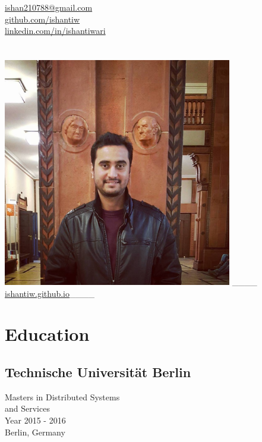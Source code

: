 \documentclass[]{hieudo-build}
\begin{document}
%
%
{
	\faEnvelope \href{mailto:ishan210788@gmail.com}{ ishan210788@gmail.com}\\
	\faGithub \href{https://github.com/ishantiw}{   github.com/ishantiw}\\
	\faLinkedinSquare \href{https://www.linkedin.com/in/ishantiwari}{ linkedin.com/in/ishantiwari}
}
    
%
%
\begin{minipage}[t]{0.34\textwidth} 

\section*{}
\includegraphics[width=0.75\textwidth]{mypic}
\linebreak
\_\_\_\_\faGithub \href{https://ishantiw.github.io}{ ishantiw.github.io}\_\_\_\_
\section{Education} 

\subsection{Technische Universität Berlin}
Masters in Distributed Systems \\
and Services \\
Year 2015 - 2016 \\
Berlin, Germany \\
\sectionsep


\end{minipage}
\end{document}
